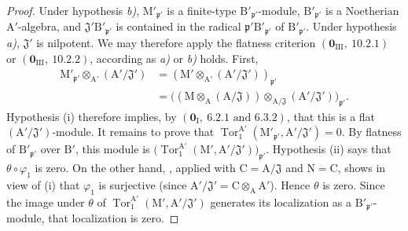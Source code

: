 \begin{proof}
Under hypothesis \emph{b)}, $\mathrm{M}'_{\mathfrak{p}'}$ is a finite-type
$\mathrm{B}'_{\mathfrak{p}'}$-module,
$\mathrm{B}'_{\mathfrak{p}'}$ is a Noetherian
$\mathrm{A}'$-algebra, and
$\mathfrak{J}'\mathrm{B}'_{\mathfrak{p}'}$ is contained in the radical
$\mathfrak{p}'\mathrm{B}'_{\mathfrak{p}'}$ of
$\mathrm{B}'_{\mathfrak{p}'}$. Under hypothesis \emph{a)},
$\mathfrak{J}'$ is nilpotent. We may therefore apply the flatness
criterion $(\mathbf{0}_{\mathrm{III}},~10.2.1)$ or
$(\mathbf{0}_{\mathrm{III}},~10.2.2)$, according as \emph{a)} or \emph{b)} holds.
First,
\[
\begin{split}
  \mathrm{M}'_{\mathfrak{p}'}\otimes_{\mathrm{A}'}
    (\mathrm{A}'/\mathfrak{J}')
  &=(\mathrm{M}'\otimes_{\mathrm{A}'}
    (\mathrm{A}'/\mathfrak{J}'))_{\mathfrak{p}'}\\
  &=\bigl((\mathrm{M}\otimes_\mathrm{A}
    (\mathrm{A}/\mathfrak{J}))
    \otimes_{\mathrm{A}/\mathfrak{J}}
    (\mathrm{A}'/\mathfrak{J}')\bigr)_{\mathfrak{p}'}.
\end{split}
\]
Hypothesis (i) therefore implies, by
$(\mathbf{0}_\mathrm{I},~6.2.1\text{ and }6.3.2)$, that this is a flat
$(\mathrm{A}'/\mathfrak{J}')$-module. It remains to prove that $\operatorname{Tor}_1^{\mathrm{A}'}
(\mathrm{M}'_{\mathfrak{p}'},\mathrm{A}'/\mathfrak{J}')=0$.
By flatness of $\mathrm{B}'_{\mathfrak{p}'}$ over $\mathrm{B}'$, this
module is $\bigl(\operatorname{Tor}_1^{\mathrm{A}'}
(\mathrm{M}',\mathrm{A}'/\mathfrak{J}')\bigr)_{\mathfrak{p}'}$.
Hypothesis (ii) says that $\theta\circ\varphi_1$ is zero. On the other
hand, , applied with
$\mathrm{C}=\mathrm{A}/\mathfrak{J}$ and $\mathrm{N}=\mathrm{C}$,
shows in view of (i) that $\varphi_1$ is surjective
(since $\mathrm{A}'/\mathfrak{J}'=\mathrm{C}\otimes_\mathrm{A}
\mathrm{A}'$). Hence $\theta$ is zero. Since the image under $\theta$
of $\operatorname{Tor}_1^{\mathrm{A}'}
(\mathrm{M}',\mathrm{A}'/\mathfrak{J}')$ generates its localization as
a $\mathrm{B}'_{\mathfrak{p}'}$-module, that localization is zero.
\end{proof}

